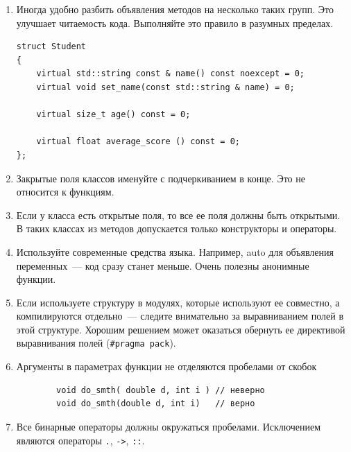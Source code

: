 \documentclass[a4paper,10pt]{article}
\begin{document}
\begin{enumerate}
    \item Иногда удобно разбить объявления методов на несколько таких групп.
        Это улучшает читаемость кода. Выполняйте это правило в разумных пределах.
\begin{lstlisting}
struct Student
{
    virtual std::string const & name() const noexcept = 0;
    virtual void set_name(const std::string & name) = 0;

    virtual size_t age() const = 0;

    virtual float average_score () const = 0;
};
\end{lstlisting}
    \item Закрытые поля классов именуйте с подчеркиванием в конце. Это не
        относится к функциям.
    \item Если у класса есть открытые поля, то все ее поля должны быть
        открытыми. В таких классах из методов допускается только конструкторы и
        операторы.
    \item Используйте современные средства языка. Например, auto для объявления
        переменных~— код сразу станет меньше. Очень полезны анонимные функции.
    \item Если используете структуру в модулях, которые используют ее совместно,
        а компилируются отдельно~— следите внимательно за выравниванием полей в
        этой структуре. Хорошим решением может оказаться обернуть ее директивой
        выравнивания полей (\verb!#pragma pack!).  
    \item Аргументы в параметрах функции не отделяются пробелами от скобок
        \begin{lstlisting}
        void do_smth( double d, int i ) // неверно
        void do_smth(double d, int i)   // верно
        \end{lstlisting}
    \item Все бинарные операторы должны окружаться пробелами.
        Исключением являются операторы {\tt .}, {\tt ->}, {\tt ::}.
\end{enumerate}
\end{document}
